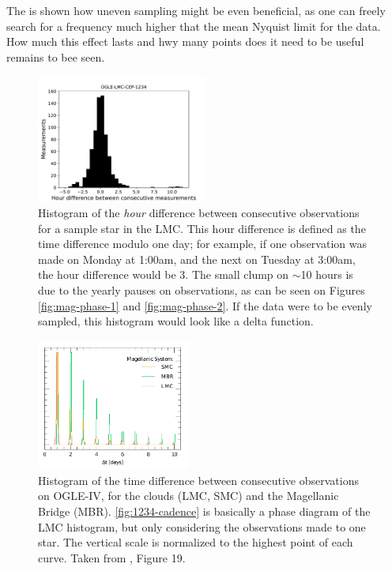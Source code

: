 The is shown how uneven sampling might be even beneficial, as one can freely search for a frequency much higher that 
the mean Nyquist limit for the data. How much this effect lasts and hwy many points does it need to be useful remains to bee seen.

\begin{figure}
	\centering
	\includegraphics[width=0.5\textwidth]{img/1234_cadence.pdf}
	\caption[Hourly difference between observations for OGLE-LMC-CEP-1234]{
		Histogram of the \textit{hour} difference between consecutive observations for a sample star in the LMC.
		This hour difference is defined as the time difference modulo one day; 
		for example, if one observation was made on Monday at 1:00am, and the next on Tuesday at 3:00am, the hour difference would be 3.
		The small clump on $\sim$10 hours is due to the yearly pauses on observations, as can be seen on Figures \ref{fig:mag-phase-1} and \ref{fig:mag-phase-2}.
		If the data were to be evenly sampled, this histogram would look like a delta function.
	}
	\label{fig:1234-cadence}
\end{figure}


\begin{figure}
	\centering
	\includegraphics[width=0.45\textwidth]{img/fig_19_65_1_1.pdf}
	\caption[OGLE-IV observation cadence in the Magellanic system]{
		Histogram of the time difference between consecutive observations on OGLE-IV, for the clouds (LMC, SMC) and the Magellanic Bridge (MBR).
		\autoref{fig:1234-cadence} is basically a phase diagram of the LMC histogram, 
		but only considering the observations made to one star.
		The vertical scale is normalized to the highest point of each curve.
		Taken from \cite{OGLE2015}, Figure 19.
	}
	\label{fig:global-cadence}
\end{figure}

